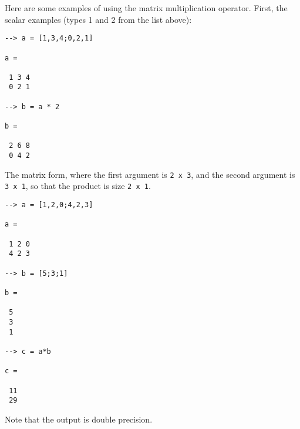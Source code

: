 Here are some examples of using the matrix multiplication operator.  First,
the scalar examples (types 1 and 2 from the list above):
\begin{verbatim}
--> a = [1,3,4;0,2,1]

a = 

 1 3 4 
 0 2 1 

--> b = a * 2

b = 

 2 6 8 
 0 4 2 
\end{verbatim}
The matrix form, where the first argument is \verb|2 x 3|, and the
second argument is \verb|3 x 1|, so that the product is size 
\verb|2 x 1|.
\begin{verbatim}
--> a = [1,2,0;4,2,3]

a = 

 1 2 0 
 4 2 3 

--> b = [5;3;1]

b = 

 5 
 3 
 1 

--> c = a*b

c = 

 11 
 29 
\end{verbatim}
Note that the output is double precision.
